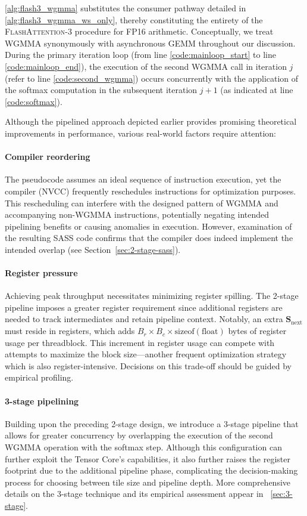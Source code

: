 \begin{algorithm}[H]
\begin{algorithmic}[1]
\cref{alg:flash3_wgmma} substitutes the consumer pathway detailed in \cref{alg:flash3_wgmma_ws_only}, thereby constituting the entirety of the \textsc{FlashAttention-3} procedure for FP16 arithmetic. Conceptually, we treat WGMMA synonymously with asynchronous GEMM throughout our discussion. During the primary iteration loop (from line \ref{code:mainloop_start} to line \ref{code:mainloop_end}), the execution of the second WGMMA call in iteration $j$ (refer to line \ref{code:second_wgmma}) occurs concurrently with the application of the softmax computation in the subsequent iteration $j+1$ (as indicated at line \ref{code:softmax}).

Although the pipelined approach depicted earlier provides promising theoretical improvements in performance, various real-world factors require attention:

\paragraph{Compiler reordering} The pseudocode assumes an ideal sequence of instruction execution, yet the compiler (NVCC) frequently reschedules instructions for optimization purposes. This rescheduling can interfere with the designed pattern of WGMMA and accompanying non-WGMMA instructions, potentially negating intended pipelining benefits or causing anomalies in execution. However, examination of the resulting SASS code confirms that the compiler does indeed implement the intended overlap (see Section~\ref{sec:2-stage-sass}).

\paragraph{Register pressure} Achieving peak throughput necessitates minimizing register spilling. The 2-stage pipeline imposes a greater register requirement since additional registers are needed to track intermediates and retain pipeline context. Notably, an extra $\mathbf{S}_{\mathrm{next}}$ must reside in registers, which adds $B_r \times B_c \times \text{sizeof}(\text{float})$ bytes of register usage per threadblock. This increment in register usage can compete with attempts to maximize the block size—another frequent optimization strategy which is also register-intensive. Decisions on this trade-off should be guided by empirical profiling.

\paragraph{3-stage pipelining} Building upon the preceding 2-stage design, we introduce a 3-stage pipeline that allows for greater concurrency by overlapping the execution of the second WGMMA operation with the softmax step. Although this configuration can further exploit the Tensor Core’s capabilities, it also further raises the register footprint due to the additional pipeline phase, complicating the decision-making process for choosing between tile size and pipeline depth. More comprehensive details on the 3-stage technique and its empirical assessment appear in ~\cref{sec:3-stage}.


\end{algorithmic}
\end{algorithm}
